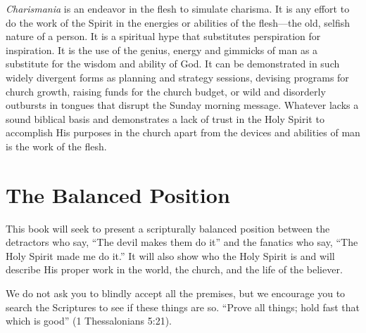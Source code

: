 \emph{Charismania} is an endeavor in the flesh to simulate charisma.
It is any effort to do the work of the Spirit in the
energies or abilities of the flesh—the old, selfish nature of
a person. It is a spiritual hype that substitutes perspiration
for inspiration. It is the use of the genius, energy and gimmicks
of man as a substitute for the wisdom and ability
of God. It can be demonstrated in such widely divergent
forms as planning and strategy sessions, devising programs
for church growth, raising funds for the church budget, or
wild and disorderly outbursts in tongues that disrupt the
Sunday morning message. Whatever lacks a sound biblical
basis and demonstrates a lack of trust in the Holy Spirit
to accomplish His purposes in the church apart from the
devices and abilities of man is the work of the flesh.


\section*{The Balanced Position}

This book will seek to present a scripturally balanced
position between the detractors who say, “The devil makes
them do it” and the fanatics who say, “The Holy Spirit made
me do it.” It will also show who the Holy Spirit is and will
describe His proper work in the world, the church, and the
life of the believer.

We do not ask you to blindly accept all the premises,
but we encourage you to search the Scriptures to see if
these things are so. “Prove all things; hold fast that which is
good” (1 Thessalonians 5:21).















